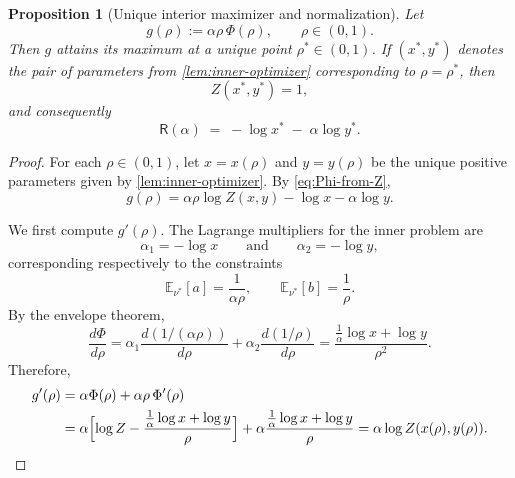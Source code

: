 \documentclass[11pt]{amsart}
\numberwithin{equation}{section}
\numberwithin{equation}{section}
\newcommand{\1}{\mathbbm{1}}
\newcommand{\E}{\mathbb{E}}
\newtheorem{proposition}[theorem]{Proposition}
\theoremstyle{definition}
\begin{document}
\begin{proposition}[Unique interior maximizer and normalization]\label{prop:Z-equals-one}
Let
\[
g(\rho):=\alpha\rho\,\Phi(\rho), \qquad \rho\in(0,1).
\]
Then \(g\) attains its maximum at a unique point \(\rho^*\in(0,1)\). If
\((x^*,y^*)\) denotes the pair of parameters from \cref{lem:inner-optimizer}
corresponding to \(\rho=\rho^*\), then
\begin{equation}\label{eq:Z-equals-one}
    Z(x^*,y^*)=1,
\end{equation}
and consequently
\begin{equation}\label{eq:R-explicit}
    \mathsf R(\alpha)\;=\;-\log x^*\;-\;\alpha\log y^*.
\end{equation}
\end{proposition}

\begin{proof}
For each \(\rho\in(0,1)\), let \(x=x(\rho)\) and \(y=y(\rho)\) be the unique
positive parameters given by \cref{lem:inner-optimizer}. By \eqref{eq:Phi-from-Z},
\begin{equation}\label{eq:g-rho-from-Z}
    g(\rho)=\alpha\rho\log Z(x,y)-\log x-\alpha\log y.
\end{equation}

We first compute \(g'(\rho)\). The Lagrange multipliers for the inner problem are
\[
\alpha_1=-\log x
\qquad\text{and}\qquad
\alpha_2=-\log y,
\]
corresponding respectively to the constraints
\[
\E_{\nu^*}[a]=\frac{1}{\alpha\rho},
\qquad
\E_{\nu^*}[b]=\frac{1}{\rho}.
\]
By the envelope theorem,
\[
\frac{d\Phi}{d\rho}
=
\alpha_1\frac{d(1/(\alpha\rho))}{d\rho}
+
\alpha_2\frac{d(1/\rho)}{d\rho}
=
\frac{\frac1\alpha\log x+\log y}{\rho^2}.
\]
Therefore,
\begin{align}
g'(\rho)
&=
\alpha\Phi(\rho)+\alpha\rho\,\Phi'(\rho) \notag\\
&=
\alpha\Bigl[\log Z-\frac{\frac1\alpha\log x+\log y}{\rho}\Bigr]
+
\alpha\frac{\frac1\alpha\log x+\log y}{\rho}
=
\alpha\log Z(x(\rho),y(\rho)).
\label{eq:g-prime-alpha-logZ}
\end{align}


\end{proof}
\end{document}
